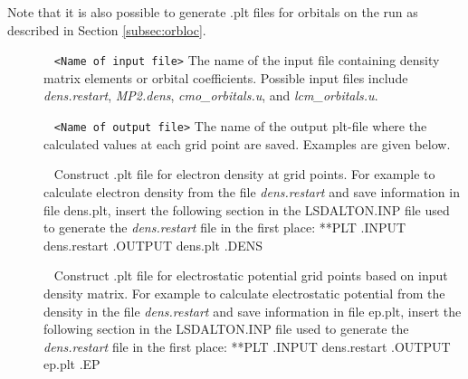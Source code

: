 Note that it is also possible to generate .plt files for orbitals on the run as described in Section \ref{subsec:orbloc}.

\begin{description}
\item[] \verb| | \newline
\verb|<Name of input file>| \newline
The name of the input file containing density matrix elements or orbital coefficients. Possible input files include \emph{dens.restart}, \emph{MP2.dens}, \emph{cmo\_orbitals.u}, and \emph{lcm\_orbitals.u}.

\item[] \verb| | \newline
\verb|<Name of output file>| \newline
The name of the output plt-file where the calculated values at each grid point are saved. Examples are given below.

\item[]\verb| | \newline
Construct .plt file for electron density at grid points.
For example to calculate electron density from the file  \emph{dens.restart} and save information in file  dens.plt,
insert the following section in the LSDALTON.INP file used to generate the  \emph{dens.restart} file in the first place:
 \newline
**PLT \newline
.INPUT \newline
dens.restart \newline
.OUTPUT \newline
dens.plt \newline
.DENS \newline

\item[]\verb| | \newline
Construct .plt file for electrostatic potential grid points based on input density matrix.
For example to calculate electrostatic potential from the density in the file  \emph{dens.restart} and save information in file  ep.plt,
insert the following section in the LSDALTON.INP file used to generate the  \emph{dens.restart} file in the first place:
 \newline
**PLT \newline
.INPUT \newline
dens.restart \newline
.OUTPUT \newline
ep.plt \newline
.EP \newline



\end{description}
